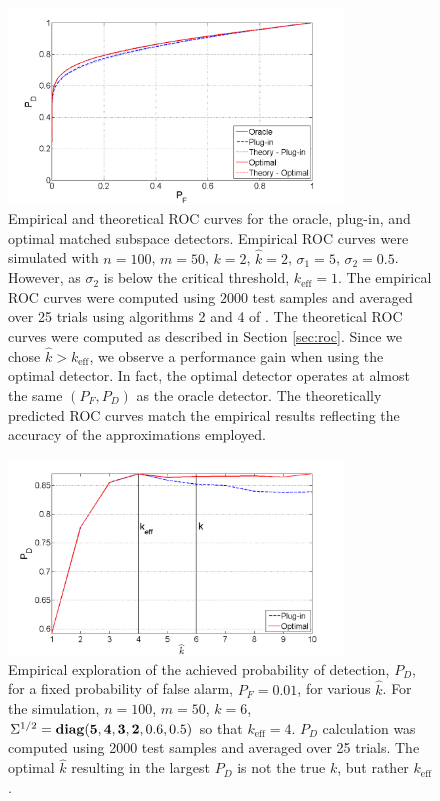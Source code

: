 \begin{figure}
\centering
\includegraphics[width=3.5in]{figures/roc_curves.png}
\caption{Empirical and theoretical ROC curves for the oracle, plug-in, and optimal matched subspace detectors. Empirical ROC curves were simulated with $n=100$, $m=50$, $k=2$, $\widehat{k}=2$, $\sigma_1=5$, $\sigma_2=0.5$. However, as $\sigma_2$ is below the critical threshold, $k_{\text{eff}} = 1$. The empirical ROC curves were computed using $2000$ test samples and averaged over 25 trials using algorithms 2 and 4 of \cite{fawcett2006introduction}. The theoretical ROC curves were computed as described in Section \ref{sec:roc}. Since we chose $\widehat{k} > k_{\text{eff}}$, we observe a performance gain when using the optimal detector. In fact, the optimal detector operates at almost the same $(P_F, P_D)$ as the oracle detector. The theoretically predicted ROC curves match the empirical results reflecting the accuracy of the approximations employed. }\vskip-0.15cm
\label{fig:roc}
\end{figure}

\begin{figure}
\centering
\includegraphics[width=3.5in]{figures/k_hat_graph.png}
\caption{Empirical exploration of the achieved probability of detection, $P_D$, for a fixed probability of false alarm, $P_F=0.01$, for various $\widehat{k}$. For the simulation, $n=100$, $m=50$, $k=6$, $\Sigma^{1/2} = \mathop{\bf diag}({\bf{5,4,3,2}},0.6,0.5)$ so that $k_{\text{eff}}=4$. $P_D$ calculation was computed using 2000 test samples and averaged over 25 trials. The optimal $\widehat{k}$ resulting in the largest $P_D$ is not the true $k$, but rather $k_\text{eff}$.}\vskip-0.15cm
\label{fig:khat}
\end{figure}


